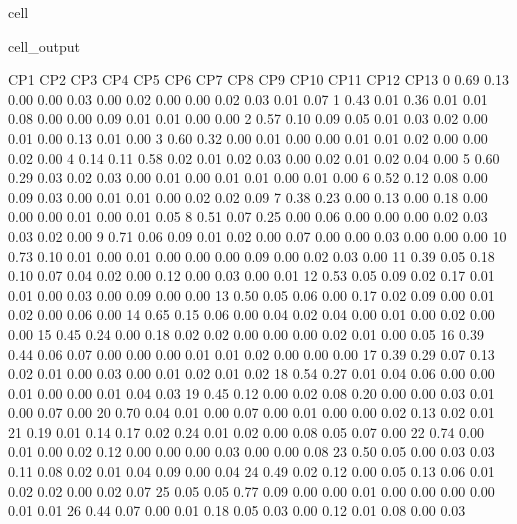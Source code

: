 \documentclass[letterpaper,10pt,english]{jupyterBook}
\begin{document}
\begin{sphinxuseclass}{cell}
\begin{sphinxVerbatimOutput}
\begin{sphinxuseclass}{cell_output}
\begin{sphinxVerbatim}[commandchars=\\\{\}]
            	CP1	CP2	CP3	CP4	CP5	CP6	CP7	CP8	CP9	CP10	CP11	CP12	CP13 
         0	0.69 	0.13 	0.00 	0.00 	0.03 	0.00 	0.02 	0.00 	0.00 	0.02 	0.03 	0.01 	0.07
         1	0.43 	0.01 	0.36 	0.01 	0.01 	0.08 	0.00 	0.00 	0.09 	0.01 	0.01 	0.00 	0.00
         2	0.57 	0.10 	0.09 	0.05 	0.01 	0.03 	0.02 	0.00 	0.01 	0.00 	0.13 	0.01 	0.00
         3	0.60 	0.32 	0.00 	0.01 	0.00 	0.00 	0.01 	0.01 	0.02 	0.00 	0.00 	0.02 	0.00
         4	0.14 	0.11 	0.58 	0.02 	0.01 	0.02 	0.03 	0.00 	0.02 	0.01 	0.02 	0.04 	0.00
         5	0.60 	0.29 	0.03 	0.02 	0.03 	0.00 	0.01 	0.00 	0.01 	0.01 	0.00 	0.01 	0.00
         6	0.52 	0.12 	0.08 	0.00 	0.09 	0.03 	0.00 	0.01 	0.01 	0.00 	0.02 	0.02 	0.09
         7	0.38 	0.23 	0.00 	0.13 	0.00 	0.18 	0.00 	0.00 	0.00 	0.01 	0.00 	0.01 	0.05
         8	0.51 	0.07 	0.25 	0.00 	0.06 	0.00 	0.00 	0.00 	0.02 	0.03 	0.03 	0.02 	0.00
         9	0.71 	0.06 	0.09 	0.01 	0.02 	0.00 	0.07 	0.00 	0.00 	0.03 	0.00 	0.00 	0.00
        10	0.73 	0.10 	0.01 	0.00 	0.01 	0.00 	0.00 	0.00 	0.09 	0.00 	0.02 	0.03 	0.00
        11	0.39 	0.05 	0.18 	0.10 	0.07 	0.04 	0.02 	0.00 	0.12 	0.00 	0.03 	0.00 	0.01
        12	0.53 	0.05 	0.09 	0.02 	0.17 	0.01 	0.01 	0.00 	0.03 	0.00 	0.09 	0.00 	0.00
        13	0.50 	0.05 	0.06 	0.00 	0.17 	0.02 	0.09 	0.00 	0.01 	0.02 	0.00 	0.06 	0.00
        14	0.65 	0.15 	0.06 	0.00 	0.04 	0.02 	0.04 	0.00 	0.01 	0.00 	0.02 	0.00 	0.00
        15	0.45 	0.24 	0.00 	0.18 	0.02 	0.02 	0.00 	0.00 	0.00 	0.02 	0.01 	0.00 	0.05
        16	0.39 	0.44 	0.06 	0.07 	0.00 	0.00 	0.00 	0.01 	0.01 	0.02 	0.00 	0.00 	0.00
        17	0.39 	0.29 	0.07 	0.13 	0.02 	0.01 	0.00 	0.03 	0.00 	0.01 	0.02 	0.01 	0.02
        18	0.54 	0.27 	0.01 	0.04 	0.06 	0.00 	0.00 	0.01 	0.00 	0.00 	0.01 	0.04 	0.03
        19	0.45 	0.12 	0.00 	0.02 	0.08 	0.20 	0.00 	0.00 	0.03 	0.01 	0.00 	0.07 	0.00
        20	0.70 	0.04 	0.01 	0.00 	0.07 	0.00 	0.01 	0.00 	0.00 	0.02 	0.13 	0.02 	0.01
        21	0.19 	0.01 	0.14 	0.17 	0.02 	0.24 	0.01 	0.02 	0.00 	0.08 	0.05 	0.07 	0.00
        22	0.74 	0.00 	0.01 	0.00 	0.02 	0.12 	0.00 	0.00 	0.00 	0.03 	0.00 	0.00 	0.08
        23	0.50 	0.05 	0.00 	0.03 	0.03 	0.11 	0.08 	0.02 	0.01 	0.04 	0.09 	0.00 	0.04
        24	0.49 	0.02 	0.12 	0.00 	0.05 	0.13 	0.06 	0.01 	0.02 	0.02 	0.00 	0.02 	0.07
        25	0.05 	0.05 	0.77 	0.09 	0.00 	0.00 	0.01 	0.00 	0.00 	0.00 	0.00 	0.01 	0.01
        26	0.44 	0.07 	0.00 	0.01 	0.18 	0.05 	0.03 	0.00 	0.12 	0.01 	0.08 	0.00 	0.03

\end{sphinxVerbatim}
\end{sphinxuseclass}
\end{sphinxVerbatimOutput}
\end{sphinxuseclass}
\end{document}
